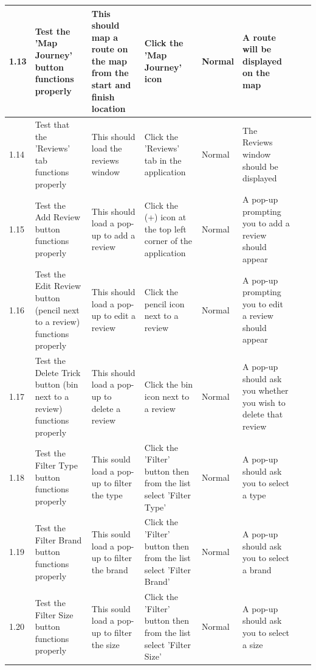 \begin{landscape}
\begin{center}
\begin{longtable}{|p{1.5cm}|p{2.5cm}|p{2.5cm}|p{2cm}|p{2cm}|p{2cm}|p{2cm}|p{2cm}|}
1.13 & Test the 'Map Journey' button functions properly & This should map a route on the map from the start and finish location &  Click the 'Map Journey' icon & Normal & A route will be displayed on the map &  \\ \hline



1.14 & Test that the 'Reviews' tab functions properly & This should load the reviews window & Click the 'Reviews' tab in the application & Normal & The Reviews window should be displayed & &  \\ \hline

1.15 & Test the Add Review button functions properly &  This should load a pop-up to add a review & Click the (+) icon at the top left corner of the application & Normal & A pop-up prompting you to add a review should appear & &  \\ \hline

1.16 & Test the Edit Review button (pencil next to a review) functions properly & This should load a pop-up to edit a review &  Click the pencil icon next to a review & Normal & A pop-up prompting you to edit a review should appear &  & \\ \hline

1.17  & Test the Delete Trick button (bin next to a review) functions properly & This should load a pop-up to delete a review &  Click the bin icon next to a review & Normal & A pop-up should ask you whether you wish to delete that review & &  \\ \hline

1.18 & Test the Filter Type button functions properly & This sould load a pop-up to filter the type & Click the 'Filter' button then from the list select 'Filter Type' & Normal &  A pop-up should ask you to select a type &  &\\ \hline

1.19 & Test the Filter Brand button functions properly & This sould load a pop-up to filter the brand & Click the 'Filter' button then from the list select 'Filter Brand' & Normal &  A pop-up should ask you to select a brand & & \\ \hline

1.20 & Test the Filter Size button functions properly & This sould load a pop-up to filter the size &  Click the 'Filter' button then from the list select 'Filter Size' & Normal &  A pop-up should ask you to select a size & & \\ \hline




\end{longtable}
\end{center}
\end{landscape}
